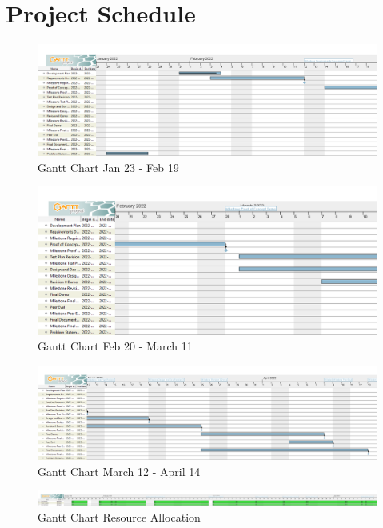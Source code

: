 \documentclass{article}
\begin{document}
\section{Project Schedule}

\begin{figure}[htp]
    \centering
    \includegraphics[width=\textwidth]{Gantt_Charts/3XA3_Gantt_1.png}
    \caption{Gantt Chart Jan 23 - Feb 19}
    \label{fig:gantt0}
\end{figure}

\begin{figure}[htp]
    \centering
    \includegraphics[width=\textwidth]{Gantt_Charts/3XA3_Gantt_2.png}
    \caption{Gantt Chart Feb 20 - March 11}
    \label{fig:gantt1}
\end{figure}

\begin{figure}[htp]
    \centering
    \includegraphics[width=\textwidth]{Gantt_Charts/3XA3_Gantt_3.png}
    \caption{Gantt Chart March 12 - April 14}
    \label{fig:gantt2}
\end{figure}

\begin{figure}[htp]
    \centering
    \includegraphics[width=\textwidth]{Gantt_Charts/3XA3_Gantt_Resources}
    \caption{Gantt Chart Resource Allocation} 
    \label{fig:gantt_resource}
\end{figure}
\end{document}
